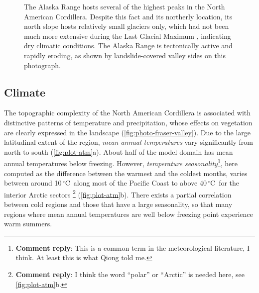 \documentclass{article}
\newcommand{\renote}[1]{\footnote{\textbf{Comment reply}: #1}}
\newcommand{\unit}[1]{\ensuremath{\mathrm{#1}}}
\newcommand{\degree}[0]{\ensuremath{^{\circ}}}
\newcommand{\degC}[0]{\unit{{\degree}C}}
\begin{document}
\begin{figure}
  \centering
  \caption{The Alaska Range hosts several of the highest peaks in the North
           American Cordillera. Despite this fact and its northerly location,
           its north slope hosts relatively small glaciers only, which had not
           been much more extensive during the Last Glacial Maximum
           \citep{Kaufman.Manley.2004}, indicating dry climatic conditions.
           The Alaska Range is tectonically active and rapidly eroding, as
           shown by landslide-covered valley sides on this photograph.}
  \label{fig:photo-alaska-range}
\end{figure}

\subsection{Climate}

The topographic complexity of the North American Cordillera is associated with
distinctive patterns of temperature and precipitation, whose effects on
vegetation are clearly expressed in the landscape
(\cref{fig:photo-fraser-valley}). Due to the large latitudinal extent of the
region, \emph{mean annual temperatures} vary significantly from north to south
(\cref{fig:plot-atm}a). About half of the model domain has mean annual
temperatures below freezing. However, \emph{temperature seasonality}\renote{
    This is a common term in the meteorological literature, I think. At least
    this is what Qiong told me.},
here computed as the difference between the warmest and the coldest months,
varies between around 10\,\degC\ along most of the Pacific Coast to above
40\,\degC\ for the interior Arctic sectors \renote{
    I think the word ``polar'' or ``Arctic'' is needed here, see
    \cref{fig:plot-atm}b.}
(\cref{fig:plot-atm}b). There exists a
partial correlation between cold regions and those that have a large
seasonality, so that many regions where mean annual temperatures are well below
freezing point experience warm summers.
\end{document}
